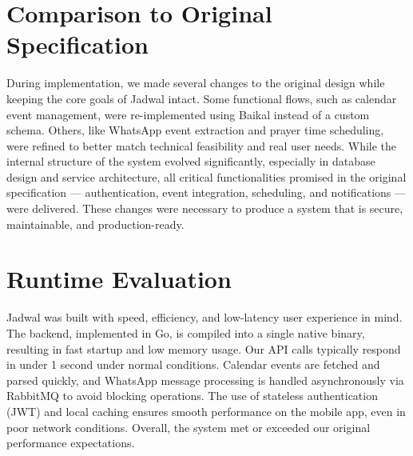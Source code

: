 \section{Comparison to Original Specification}

During implementation, we made several changes to the original design while keeping the core goals of Jadwal intact. Some functional flows, such as calendar event management, were re-implemented using Baikal instead of a custom schema. Others, like WhatsApp event extraction and prayer time scheduling, were refined to better match technical feasibility and real user needs. While the internal structure of the system evolved significantly, especially in database design and service architecture, all critical functionalities promised in the original specification — authentication, event integration, scheduling, and notifications — were delivered. These changes were necessary to produce a system that is secure, maintainable, and production-ready.

\section{Runtime Evaluation}

Jadwal was built with speed, efficiency, and low-latency user experience in mind. The backend, implemented in Go, is compiled into a single native binary, resulting in fast startup and low memory usage. Our API calls typically respond in under 1 second under normal conditions. Calendar events are fetched and parsed quickly, and WhatsApp message processing is handled asynchronously via RabbitMQ to avoid blocking operations. The use of stateless authentication (JWT) and local caching ensures smooth performance on the mobile app, even in poor network conditions. Overall, the system met or exceeded our original performance expectations.
